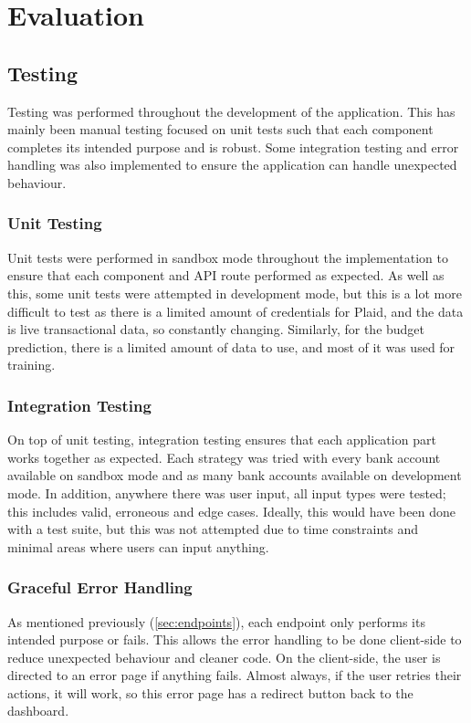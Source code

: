 \chapter{Evaluation}
\label{ch:evaluation}

\section{Testing}
Testing was performed throughout the development of the application. This has mainly been manual testing focused on unit tests such that each component completes its intended purpose and is robust. Some integration testing and error handling was also implemented to ensure the application can handle unexpected behaviour.

\subsection{Unit Testing}
Unit tests were performed in sandbox mode throughout the implementation to ensure that each component and API route performed as expected. As well as this, some unit tests were attempted in development mode, but this is a lot more difficult to test as there is a limited amount of credentials for Plaid, and the data is live transactional data, so constantly changing. Similarly, for the budget prediction, there is a limited amount of data to use, and most of it was used for training.

\subsection{Integration Testing}
On top of unit testing, integration testing ensures that each application part works together as expected. Each strategy was tried with every bank account available on sandbox mode and as many bank accounts available on development mode. In addition, anywhere there was user input, all input types were tested; this includes valid, erroneous and edge cases. Ideally, this would have been done with a test suite, but this was not attempted due to time constraints and minimal areas where users can input anything.


\subsection{Graceful Error Handling}
As mentioned previously (\ref{sec:endpoints}), each endpoint only performs its intended purpose or fails. This allows the error handling to be done client-side to reduce unexpected behaviour and cleaner code. On the client-side, the user is directed to an error page if anything fails. Almost always, if the user retries their actions, it will work, so this error page has a redirect button back to the dashboard.


